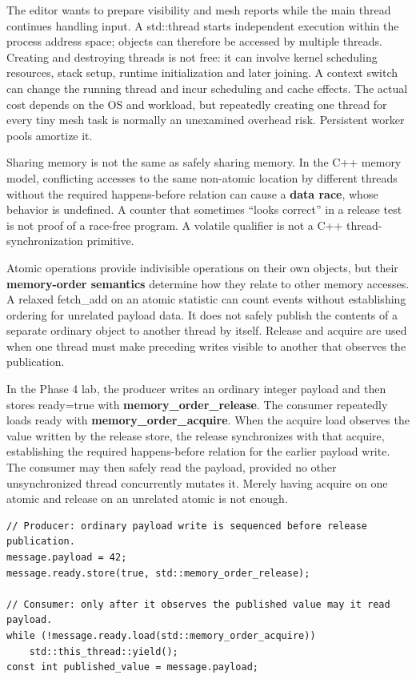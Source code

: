 The editor wants to prepare visibility and mesh reports while the main thread continues handling input. A std::thread starts independent execution within the process address space; objects can therefore be accessed by multiple threads. Creating and destroying threads is not free: it can involve kernel scheduling resources, stack setup, runtime initialization and later joining. A context switch can change the running thread and incur scheduling and cache effects. The actual cost depends on the OS and workload, but repeatedly creating one thread for every tiny mesh task is normally an unexamined overhead risk. Persistent worker pools amortize it.

Sharing memory is not the same as safely sharing memory. In the C++ memory model, conflicting accesses to the same non-atomic location by different threads without the required happens-before relation can cause a \textbf{data race}, whose behavior is undefined. A counter that sometimes ``looks correct'' in a release test is not proof of a race-free program. A volatile qualifier is not a C++ thread-synchronization primitive.

Atomic operations provide indivisible operations on their own objects, but their \textbf{memory-order semantics} determine how they relate to other memory accesses. A relaxed fetch\_add on an atomic statistic can count events without establishing ordering for unrelated payload data. It does not safely publish the contents of a separate ordinary object to another thread by itself. Release and acquire are used when one thread must make preceding writes visible to another that observes the publication.

In the Phase 4 lab, the producer writes an ordinary integer payload and then stores ready=true with \textbf{memory\_order\_release}. The consumer repeatedly loads ready with \textbf{memory\_order\_acquire}. When the acquire load observes the value written by the release store, the release synchronizes with that acquire, establishing the required happens-before relation for the earlier payload write. The consumer may then safely read the payload, provided no other unsynchronized thread concurrently mutates it. Merely having acquire on one atomic and release on an unrelated atomic is not enough.

\begin{verbatim}
// Producer: ordinary payload write is sequenced before release publication.
message.payload = 42;
message.ready.store(true, std::memory_order_release);

// Consumer: only after it observes the published value may it read payload.
while (!message.ready.load(std::memory_order_acquire))
    std::this_thread::yield();
const int published_value = message.payload;
\end{verbatim}

